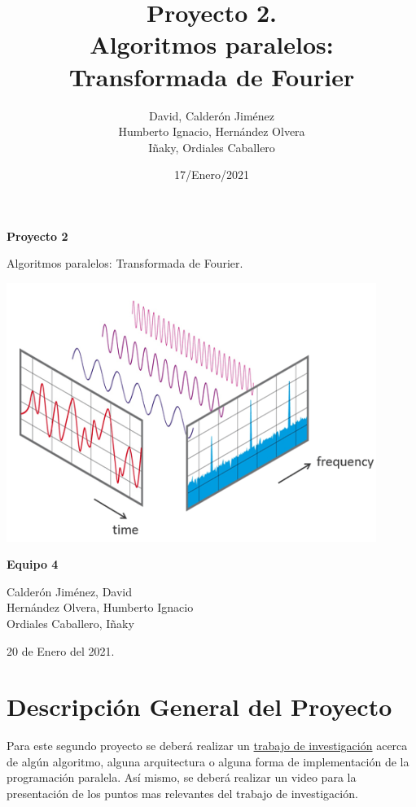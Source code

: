\documentclass{report}
\title{\myfont Proyecto 2.\\Algoritmos paralelos: Transformada de Fourier
}
\author{David, Calderón Jiménez
        \\ Humberto Ignacio, Hernández Olvera
        \\ Iñaky, Ordiales Caballero}
\date{17/Enero/2021}
\newcommand{\sizefont}{%
\fontsize{13}{16}\selectfont}
\begin{document}
\begin{titlepage}
    \begin{center}
        \vspace*{1 cm}
        
        \Huge
        \textbf{\myfont Proyecto 2}
        
        \vspace{0.5cm}
        Algoritmos paralelos: Transformada de Fourier.
        
        \vspace{1.5cm}
        \includegraphics[width=0.9\textwidth]{Images/Portada.png}
        
        \vspace{2cm}
        \LARGE 
        \textbf{Equipo 4\\}
        
        \vspace{0.3cm}
        \Large 
        Calderón Jiménez, David\\
        Hernández Olvera, Humberto Ignacio\\
        Ordiales Caballero, Iñaky
        
        \vspace{0.5cm}
        20 de Enero del 2021.
        \vspace{3cm}
    \end{center}
\end{titlepage}
\fancyhf{}
\fancyfoot[R]{\sizefont Página \thepage}

\section*{Descripción General del Proyecto}
\noindent Para este segundo proyecto se deberá realizar un \underline{trabajo de investigación} acerca de algún algoritmo, alguna arquitectura o alguna forma de implementación de la programación paralela. Así mismo, se deberá realizar un video para la presentación de los puntos mas relevantes del trabajo de investigación.
\end{document}
